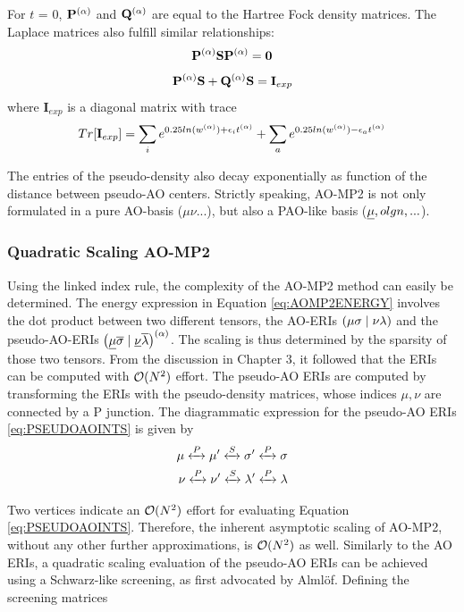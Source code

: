 \noindent For $t$ = 0, $\mathbf{P}^{(\alpha)}$ and $\mathbf{Q}^{(\alpha)}$ are equal to the Hartree Fock density matrices. The Laplace matrices also fulfill similar relationships:
\begin{equation}
\mathbf{P}^{(\alpha)} \mathbf{S} \mathbf{P}^{(\alpha)} = \mathbf{0}
\label{eq:PSP0}
\end{equation}
\begin{equation}
\mathbf{P}^{(\alpha)} \mathbf{S} + \mathbf{Q}^{(\alpha)} \mathbf{S} = \mathbf{I}_{exp}
\end{equation}
\noindent where $\mathbf{I}_{exp}$ is a diagonal matrix with trace
\begin{equation}
Tr[\mathbf{I}_{exp}] = \sum_i e^{0.25 ln(w^{(\alpha)}) + \epsilon_i t^{(\alpha)}} + \sum_a e^{0.25 ln(w^{(\alpha)}) - \epsilon_a t^{(\alpha)}}
\end{equation}

The entries of the pseudo-density also decay exponentially as function of the distance between pseudo-AO centers. Strictly speaking, AO-MP2 is not only formulated in a pure AO-basis ($\mu\nu...$), but also a PAO-like basis ($\underline{\mu},olgn,...$). 

\subsubsection{Quadratic Scaling AO-MP2}

Using the linked index rule, the complexity of the AO-MP2 method can easily be determined. The energy expression in Equation \ref{eq:AOMP2ENERGY} involves the dot product between two different tensors, the AO-ERIs $\left( \mu\sigma \mid \nu\lambda \right)$ and the pseudo-AO-ERIs $\left( \underline{\mu}\overline{\sigma} \mid \underline{\nu}\overline{\lambda} \right)^{(\alpha)}$. The scaling is thus determined by the sparsity of those two tensors. From the discussion in Chapter 3, it followed that the ERIs can be computed with $\mathcal{O}(N^{2})$ effort. The pseudo-AO ERIs are computed by transforming the ERIs with the pseudo-density matrices, whose indices $\mu,\nu$ are connected by a P junction. The diagrammatic expression for the pseudo-AO ERIs \ref{eq:PSEUDOAOINTS} is given by
\begin{equation}
\begin{split}
\mu \xleftrightarrow{P} \mu' \xleftrightarrow{S} \sigma' \xleftrightarrow{P} \sigma \\
\nu \xleftrightarrow{P} \nu' \xleftrightarrow{S} \lambda' \xleftrightarrow{P} \lambda
\end{split}
\end{equation}

\noindent Two vertices indicate an $\mathcal{O}(N^{2})$ effort for evaluating Equation \ref{eq:PSEUDOAOINTS}. Therefore, the inherent asymptotic scaling of AO-MP2, without any other further approximations, is $\mathcal{O}(N^{2})$ as well. Similarly to the AO ERIs, a quadratic scaling evaluation of the pseudo-AO ERIs can be achieved using a Schwarz-like screening, as first advocated by Almlöf. Defining the screening matrices

